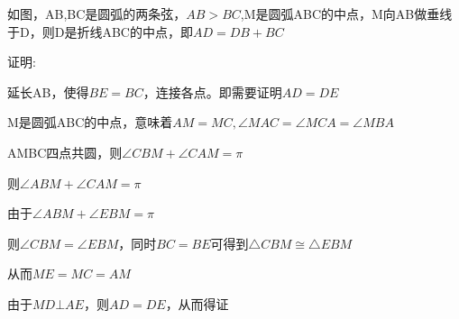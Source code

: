 \documentclass[11pt]{ctexart}
\begin{document}
如图，AB,BC是圆弧的两条弦，$AB>BC$,M是圆弧ABC的中点，M向AB做垂线于D，则D是折线ABC的中点，即$AD=DB+BC$

证明:

延长AB，使得$BE=BC$，连接各点。即需要证明$AD=DE$

M是圆弧ABC的中点，意味着$AM=MC,\angle MAC=\angle MCA=\angle MBA$

AMBC四点共圆，则$\angle CBM+\angle CAM =\pi$

则$\angle ABM+\angle CAM =\pi$

由于$\angle ABM+\angle EBM =\pi$

则$\angle CBM=\angle EBM$，同时$BC=BE$可得到$\bigtriangleup CBM \cong \bigtriangleup EBM$

从而$ME=MC=AM$

由于$MD\bot AE$，则$AD=DE$，从而得证
\end{document}
